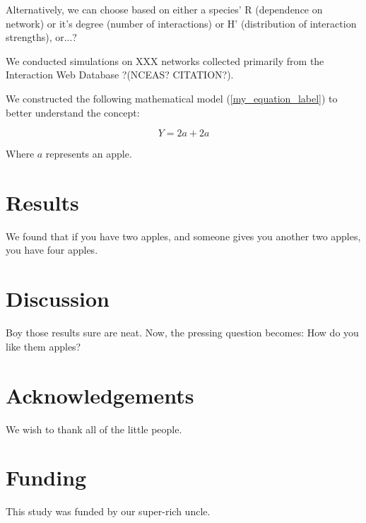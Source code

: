 \documentclass[11pt,letterpaper]{article} %
\begin{document}
Alternatively, we can choose based on either a species' R (dependence on network) or it's degree (number of interactions) or H' (distribution of interaction strengths), or...?

We conducted simulations on XXX networks collected primarily from the Interaction Web Database ?(NCEAS? CITATION?).



We constructed the following mathematical model (\ref{my_equation_label}) to better understand the concept:

\begin{equation}\label{my_equation_label}
	Y = 2a + 2a
\end{equation}

Where $a$ represents an apple.

\section*{Results}
We found that if you have two apples, and someone gives you another two apples, you have four apples.

\section*{Discussion}
Boy those results sure are neat. Now, the pressing question becomes: How do you like them apples?

\section*{Acknowledgements}
We wish to thank all of the little people.

\section*{Funding}
This study was funded by our super-rich uncle.

\end{document}

